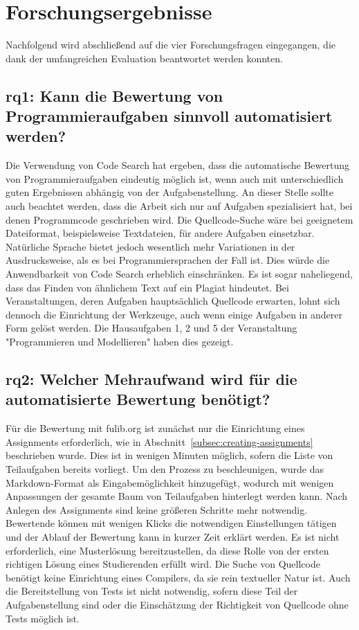 \section{Forschungsergebnisse}\label{sec:research-results}

Nachfolgend wird abschließend auf die vier Forschungsfragen eingegangen, die dank der umfangreichen Evaluation beantwortet werden konnten.

\subsection[\acs{rq}1]{\ac{rq}1: Kann die Bewertung von Programmieraufgaben sinnvoll automatisiert werden?}\label{subsec:ra1-useful-automation}

Die Verwendung von Code Search hat ergeben, dass die automatische Bewertung von Programmieraufgaben eindeutig möglich ist, wenn auch mit unterschiedlich guten Ergebnissen abhängig von der Aufgabenstellung.
An dieser Stelle sollte auch beachtet werden, dass die Arbeit sich nur auf Aufgaben spezialisiert hat, bei denen Programmcode geschrieben wird.
Die Quellcode-Suche wäre bei geeignetem Dateiformat, beispielsweise Textdateien, für andere Aufgaben einsetzbar.
Natürliche Sprache bietet jedoch wesentlich mehr Variationen in der Ausdrucksweise, als es bei Programmiersprachen der Fall ist.
Dies würde die Anwendbarkeit von Code Search erheblich einschränken.
Es ist sogar naheliegend, dass das Finden von ähnlichem Text auf ein Plagiat hindeutet.
Bei Veranstaltungen, deren Aufgaben hauptsächlich Quellcode erwarten, lohnt sich dennoch die Einrichtung der Werkzeuge, auch wenn einige Aufgaben in anderer Form gelöst werden.
Die Hausaufgaben 1, 2 und 5 der Veranstaltung "Programmieren und Modellieren" haben dies gezeigt.

\subsection[\acs{rq}2]{\ac{rq}2: Welcher Mehraufwand wird für die automatisierte Bewertung benötigt?}\label{subsec:ra2-additional-effort}

Für die Bewertung mit fulib.org ist zunächst nur die Einrichtung eines Assignments erforderlich, wie in Abschnitt~\ref{subsec:creating-assignments} beschrieben wurde.
Dies ist in wenigen Minuten möglich, sofern die Liste von Teilaufgaben bereits vorliegt.
Um den Prozess zu beschleunigen, wurde das Markdown-Format als Eingabemöglichkeit hinzugefügt, wodurch mit wenigen Anpassungen der gesamte Baum von Teilaufgaben hinterlegt werden kann.
Nach Anlegen des Assignments sind keine größeren Schritte mehr notwendig.
Bewertende können mit wenigen Klicks die notwendigen Einstellungen tätigen und der Ablauf der Bewertung kann in kurzer Zeit erklärt werden.
Es ist nicht erforderlich, eine Musterlösung bereitzustellen, da diese Rolle von der ersten richtigen Lösung eines Studierenden erfüllt wird.
Die Suche von Quellcode benötigt keine Einrichtung eines Compilers, da sie rein textueller Natur ist.
Auch die Bereitstellung von Tests ist nicht notwendig, sofern diese Teil der Aufgabenstellung sind oder die Einschätzung der Richtigkeit von Quellcode ohne Tests möglich ist.

